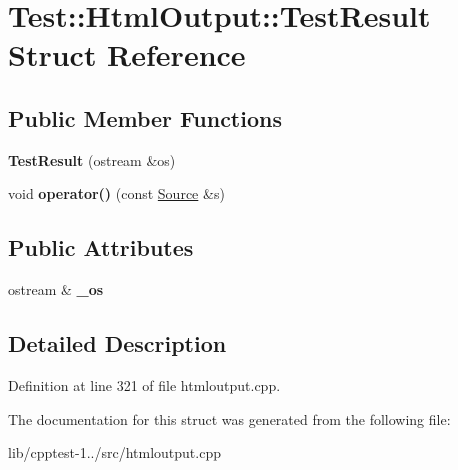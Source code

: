 \hypertarget{struct_test_1_1_html_output_1_1_test_result}{}\section{Test\+:\+:Html\+Output\+:\+:Test\+Result Struct Reference}
\label{struct_test_1_1_html_output_1_1_test_result}
\subsection*{Public Member Functions}
\begin{DoxyCompactItemize}
\item 
{\bfseries Test\+Result} (ostream \&os)\hypertarget{struct_test_1_1_html_output_1_1_test_result_a51b442100cb31dca7e2f25cc06757971}{}\label{struct_test_1_1_html_output_1_1_test_result_a51b442100cb31dca7e2f25cc06757971}

\item 
void {\bfseries operator()} (const \hyperlink{class_test_1_1_source}{Source} \&s)\hypertarget{struct_test_1_1_html_output_1_1_test_result_ab5aaddd39ccf7814f910f9a7a88505a2}{}\label{struct_test_1_1_html_output_1_1_test_result_ab5aaddd39ccf7814f910f9a7a88505a2}

\end{DoxyCompactItemize}
\subsection*{Public Attributes}
\begin{DoxyCompactItemize}
\item 
ostream \& {\bfseries \+\_\+os}\hypertarget{struct_test_1_1_html_output_1_1_test_result_a00fdad3da3ee095194fb25f127bd453b}{}\label{struct_test_1_1_html_output_1_1_test_result_a00fdad3da3ee095194fb25f127bd453b}

\end{DoxyCompactItemize}


\subsection{Detailed Description}


Definition at line 321 of file htmloutput.\+cpp.



The documentation for this struct was generated from the following file\+:\begin{DoxyCompactItemize}
\item 
lib/cpptest-\/1../src/htmloutput.\+cpp\end{DoxyCompactItemize}
